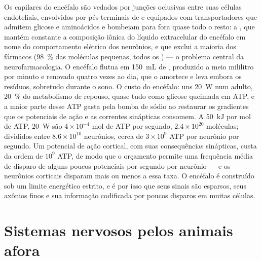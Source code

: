 \begin{proposition}\label{prop:b3:nervous-systems:barrier-budget}
Os capilares do encéfalo são vedados por junções oclusivas entre suas
células endoteliais, envolvidos por pés terminais de  e
equipados com transportadores que admitem glicose e aminoácidos e
bombeiam para fora quase todo o resto: a \emph{}, que mantém constante a composição iônica do líquido
extracelular do encéfalo em nome do comportamento elétrico dos
neurônios, e que exclui a maioria dos fármacos (\qty{98}{\%} das
moléculas pequenas, todos os ) --- o problema central da
neurofarmacologia. O encéfalo flutua em \qty{150}{mL} de \emph{}, produzido a meio mililitro por minuto e renovado
quatro vezes ao dia, que o amortece e leva embora os resíduos,
sobretudo durante o sono. O custo do encéfalo: uns \qty{20}{W} num
adulto, \qty{20}{\%} do metabolismo de repouso, quase tudo como glicose
queimada em ATP, e a maior parte desse ATP gasta pela bomba de sódio ao
restaurar os gradientes que os potenciais de ação e as correntes
sinápticas consomem. A \qty{50}{kJ} por mol de ATP, \qty{20}{W} são
$4\times 10^{-4}$ mol de ATP por segundo, $2.4\times 10^{20}$
moléculas; divididos entre $8.6\times 10^{10}$ neurônios, cerca de
$3\times 10^{9}$ ATP por neurônio por segundo. Um potencial de ação
cortical, com suas consequências sinápticas, custa da ordem de $10^{9}$
ATP, de modo que o orçamento permite uma frequência média de disparo de
alguns poucos potenciais por segundo por neurônio --- e os neurônios
corticais disparam mais ou menos a essa taxa. O encéfalo é construído
sob um limite energético estrito, e é por isso que seus sinais são
esparsos, seus axônios finos e sua informação codificada por poucos
disparos em muitas células.
\end{proposition}
\admitted

\section{Sistemas nervosos pelos animais afora}


